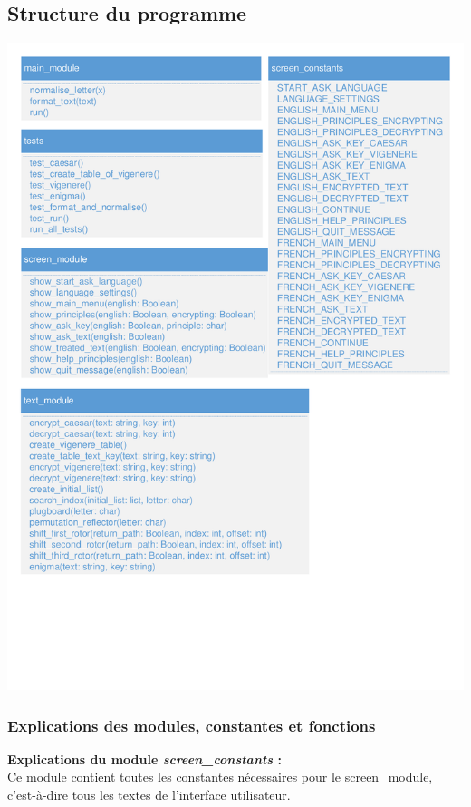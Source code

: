 \documentclass[a4paper,12pt,abstracton,titlepage]{scrartcl}
\begin{document}
{\subsection{Structure du programme}
\vspace{1cm}
\begin{minipage}[c]{\textwidth}
\centering
    \includegraphics[width=\textwidth, trim=1mm 50mm 1mm 1mm, clip]{./Diagrammes/diagrammeDeStructure.pdf}
    \label{img:structure}
\end{minipage}


\newpage
\subsubsection{Explications des modules, constantes et fonctions}
\textbf{Explications du module \textit{screen\_constants} :}\\
Ce module contient toutes les constantes nécessaires pour le screen\_module, c'est-à-dire tous les textes de l'interface utilisateur.
\vspace{0.3cm}

}
\end{document}
